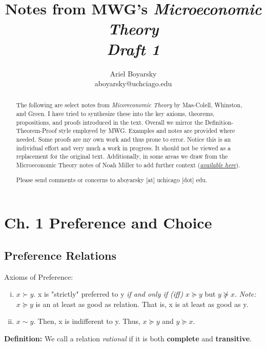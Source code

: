 \documentclass[12pt]{article}
\begin{document}
\title{Notes from MWG's \emph{Microeconomic Theory \\ Draft 1}} 
\author{Ariel Boyarsky\\ aboyarsky@uchciago.edu} 
\maketitle


\begin{abstract}
The following are select notes from \emph{Micoreconomic Theory} by Mas-Colell, Whinston, and Green. I have tried to synthesize these into the key axioms, theorems, propositions, and proofs introduced in the text. Overall we mirror the Definition-Theorem-Proof style employed by MWG. Examples and notes are provided where needed. Some proofs are my own work and thus prone to error. Notice this is an individual effort and very much a work in progress. It should not be viewed as a replacement for the original text. Additionally, in some areas we draw from the Microeconomic Theory notes of Noah Miller to add further context (\href{https://business.illinois.edu/nmiller/documents/notes/firsthalf.pdf}{\emph{available here}}).

Please send comments or concerns to aboyarsky [at] uchicago [dot] edu.
\end{abstract}
\section{Ch. 1 Preference and Choice}
\subsection{Preference Relations}
Axioms of Preference:
\begin{enumerate}[i.]
	\item $x \succ y$. x is "strictly" preferred to y \emph{if and only if (iff)} $x \succeq y$ but $y \not\succeq x$. 
	\emph{Note:} $x \succeq y$ is an at least as good as relation. That is, x is at least as good as y. 
	\item $x \sim y$. Then,  x is indifferent to y. Thus,  $x \succeq y$ and $y \succeq x$.
\end{enumerate}

\textbf{Definition:} We call a relation \emph{rational} if it is both \textbf{complete} and \textbf{transitive}.
\end{document}
